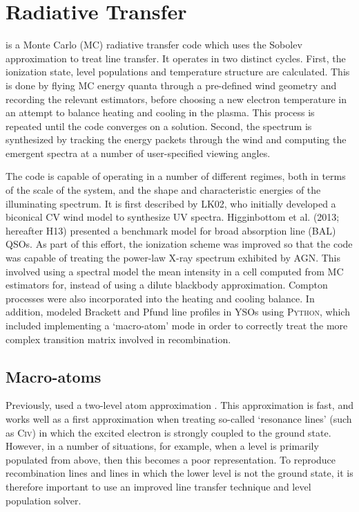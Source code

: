 \documentclass[preprint, a4paper, 11pt]{aastex}
\begin{document}
\section{Radiative Transfer}

\py is a Monte Carlo (MC) radiative transfer code which uses
the Sobolev approximation to treat line transfer. It operates 
in two distinct cycles. First, the ionization state, level populations
and temperature structure are calculated. This is done by
flying MC energy quanta through a pre-defined wind geometry and recording
the relevant estimators, before choosing  a new electron temperature 
in an attempt to balance heating and cooling in the plasma.
This process is repeated until the code converges on a 
solution. Second, the spectrum is synthesized by tracking
the energy packets through the wind and computing the 
emergent spectra at a number of user-specified viewing angles.

The code is capable of operating in a number of different
regimes, both in terms of the scale of the system, and the 
shape and characteristic energies of the illuminating spectrum. It is 
first described by LK02, who initially developed a biconical CV 
wind model to synthesize UV spectra. 
Higginbottom et al.\nocite{higginbottom2013} (2013; hereafter H13) presented a 
benchmark model for broad absorption line (BAL) QSOs.
As part of this effort, the ionization scheme was improved so that 
the code was capable of treating the power-law X-ray spectrum
exhibited by AGN.
This involved using a spectral model the mean intensity in a cell
computed from MC estimators for, instead of using a dilute blackbody
approximation. Compton processes
were also incorporated into the heating and cooling balance.
In addition, \cite[][SDL05]{simmacro2005} modeled
Brackett and Pfund line profiles in YSOs using \textsc{Python,} which included
implementing a `macro-atom' mode in order to correctly treat the more
complex transition matrix involved in recombination. 



\subsection{Macro-atoms}

Previously, \py used a two-level atom approximation \cite[see e.g.][]{mihalas}. This approximation is 
fast, and works well as a first approximation when treating so-called `resonance lines' (such as C\textsc{iv}) 
in which the excited electron is strongly coupled to the ground state.
However, in a number of situations, for example, when a level is primarily populated from above, then
this becomes a poor representation. 
To reproduce recombination lines and lines in which the lower level is not the ground state, 
it is therefore important to use an improved line transfer technique and level population solver.
\end{document}
